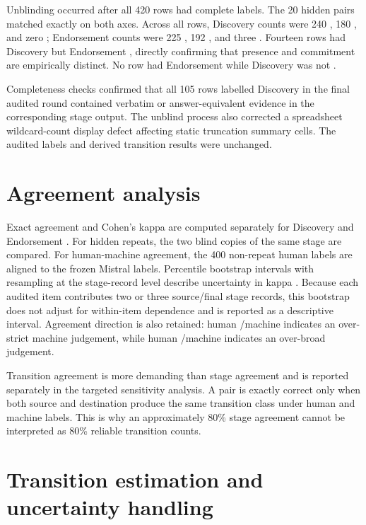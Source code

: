 Unblinding occurred after all 420 rows had complete labels. The 20 hidden pairs matched exactly on both axes. Across all rows, Discovery counts were 240 \correct{}, 180 \wrong{}, and zero \uncertain{}; Endorsement counts were 225 \correct{}, 192 \wrong{}, and three \uncertain{}. Fourteen rows had Discovery \correct{} but Endorsement \wrong{}, directly confirming that presence and commitment are empirically distinct. No row had Endorsement \correct{} while Discovery was not \correct{}.

Completeness checks confirmed that all 105 rows labelled Discovery \correct{} in the final audited round contained verbatim or answer-equivalent evidence in the corresponding stage output. The unblind process also corrected a spreadsheet wildcard-count display defect affecting static truncation summary cells. The audited labels and derived transition results were unchanged.

\section{Agreement analysis}

Exact agreement and Cohen's kappa are computed separately for Discovery and Endorsement \citep{cohen1960coefficient}. For hidden repeats, the two blind copies of the same stage are compared. For human-machine agreement, the 400 non-repeat human labels are aligned to the frozen Mistral labels. Percentile bootstrap intervals with resampling at the stage-record level describe uncertainty in kappa \citep{efron1994bootstrap}. Because each audited item contributes two or three source/final stage records, this bootstrap does not adjust for within-item dependence and is reported as a descriptive interval. Agreement direction is also retained: human \correct{}/machine \wrong{} indicates an over-strict machine judgement, while human \wrong{}/machine \correct{} indicates an over-broad judgement.

Transition agreement is more demanding than stage agreement and is reported separately in the targeted sensitivity analysis. A pair is exactly correct only when both source and destination produce the same transition class under human and machine labels. This is why an approximately 80\% stage agreement cannot be interpreted as 80\% reliable transition counts.

\section{Transition estimation and uncertainty handling}

